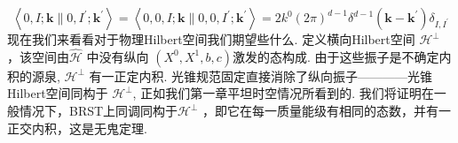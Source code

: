 \begin{equation}
\left\langle 0, I ; \mathbf{k} \| 0, I^{\prime} ; \mathbf{k}^{\prime}\right\rangle=\left\langle 0,0, I ; \mathbf{k} \| 0,0, I^{\prime} ; \mathbf{k}^{\prime}\right\rangle=2 k^{0}(2 \pi)^{d-1} \delta^{d-1}\left(\mathbf{k}-\mathbf{k}^{\prime}\right) \delta_{I, I^{\prime}}
\end{equation}
现在我们来看看对于物理Hilbert空间我们期望些什么. 定义横向Hilbert空间 $\mathscr{H}^{\perp}$ ，该空间由$\hat{\mathscr{H}}$ 中没有纵向 $\left(X^{0}, X^{1}, b,c\right)$激发的态构成. 由于这些振子是不确定内积的源泉, $\mathscr{H}^{\perp}$ 有一正定内积. 光锥规范固定直接消除了纵向振子————光锥Hilbert空间同构于 $\mathscr{H}^{\perp}$, 正如我们第一章平坦时空情况所看到的. 我们将证明在一般情况下，BRST上同调同构于$\mathscr{H}^{\perp} $ ，即它在每一质量能级有相同的态数，并有一正交内积，这是无鬼定理.\\


